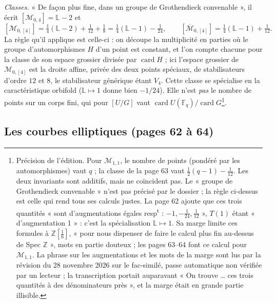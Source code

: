 \documentclass[11pt,a4paper]{article}
\begin{document}
\emph{Classes.} « De façon plus fine, dans un groupe de Grothendieck convenable »,
il écrit $[\mathcal{M}_{0,4}] = \mathbb{L} - 2$ et
\[
[\mathcal{M}_{0,[4]}] = \tfrac14(\mathbb{L} - 2) + \tfrac{1}{12} + \tfrac18 =
\tfrac14(\mathbb{L} - 1) - \tfrac{1}{24}, \qquad
[\overline{\mathcal{M}}_{0,[4]}] = \tfrac14(\mathbb{L} - 1) + \tfrac{1}{12} .
\]
La règle qu'il applique est celle-ci : on découpe la multiplicité en parties où le
groupe d'automorphismes $H$ d'un point est constant, et l'on compte chacune pour la
classe de son espace grossier divisée par $\operatorname{card} H$ ; ici l'espace
grossier de $\mathcal{M}_{0,[4]}$ est la droite affine, privée des deux points
spéciaux, de stabilisateurs d'ordre $12$ et $8$, le stabilisateur générique étant
$V_4$. Cette classe se spécialise en la caractéristique orbifold ($\mathbb{L}
\mapsto 1$ donne bien $-1/24$). Elle n'est \emph{pas} le nombre de points sur un
corps fini, qui pour $[U/G]$ vaut $\operatorname{card} U(\mathbb{F}_q) /
\operatorname{card} G$\footnote{Précision de l'édition. Pour $\mathcal{M}_{1,1}$,
le nombre de points (pondéré par les automorphismes) vaut $q$ ; la classe de la
page 63 vaut $\frac12(q - 1) - \frac{1}{12}$. Les deux invariants sont additifs,
mais ne coïncident pas. Le « groupe de Grothendieck convenable » n'est pas
précisé par le dossier ; la règle ci-dessus est celle qui rend tous ses calculs
justes. La page 62 ajoute que ces trois quantités « sont d'augmentations
égales resp\textsuperscript{t} : $-1, -\frac{1}{24}, \frac{1}{12}$ », $T(1)$
étant « d'augmentation 1 » : c'est la spécialisation $\mathbb{L} \mapsto 1$.
Sa marge limite ces formules à $\mathbb{Z}[\frac16]$, « pour nous dispenser de
faire le calcul plus fin au-dessus de Spec $\mathbb{Z}$ », mots en partie
douteux ; les pages 63--64 font ce calcul pour $\mathcal{M}_{1,1}$. La phrase
sur les augmentations et les mots de la marge sont lus par la révision du
28 novembre 2026 sur le fac-similé, passe automatique non vérifiée par un
lecteur ; la transcription portait auparavant « On trouve \ldots{} ces trois
quantités à des dénominateurs près », et la marge était en grande partie
illisible.}.

\subsection*{Les courbes elliptiques (pages 62 à 64)}
\end{document}
